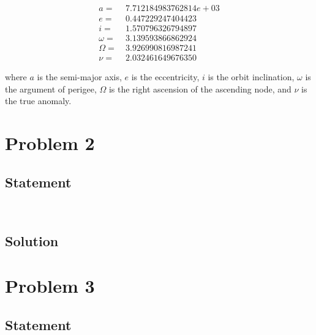 \documentclass[conf]{new-aiaa}
\begin{document}
\begin{equation}
\begin{aligned}
a = &~ 7.712184983762814e+03 \\ 
e = &~ 0.447229247404423 \\ 
i = &~ 1.570796326794897 \\ 
\omega = &~ 3.139593866862924 \\ 
\Omega = &~ 3.926990816987241 \\ 
\nu = &~ 2.032461649676350  
\end{aligned}
\end{equation}

where $a$ is the semi-major axis, $e$ is the eccentricity, $i$ is the orbit inclination, $\omega$ is the argument of perigee, $\Omega$ is the right ascension of the ascending node, and $\nu$ is the true anomaly. 

\section{Problem 2} 

\subsection{Statement} 
\begin{center}
 \\
\end{center}

\subsection{Solution} 



\section{Problem 3} 

\subsection{Statement} 
\begin{center}
	 \\
\end{center}
\end{document}
